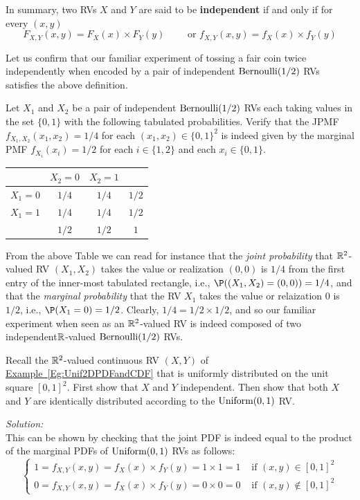 In summary, two RVs $X$ and $Y$ are said to be {\bf independent} if and only if for every $(x,y)$
\[
\boxed{
F_{X,Y}(x,y) = F_X(x) \times F_Y(y) \qquad \text{ or } f_{X,Y}(x,y) = f_X(x) \times f_Y(y)
}
\]

Let us confirm that our familiar experiment of tossing a fair coin twice independently when encoded by a pair of independent $\mbox{{\rm Bernoulli}}(1/2)$ RVs satisfies the above definition.

\begin{example}\label{EgIndepPairOfBernoulis}
Let $X_1$ and $X_2$ be a pair of independent $\mbox{{\rm Bernoulli}}(1/2)$ RVs each taking values in the set $\{0,1\}$ with the following tabulated probabilities. Verify that the JPMF $f_{X_1,X_2}(x_1,x_2)=1/4$ for each $(x_1,x_2) \in \{0,1\}^2$ is indeed given by the marginal PMF $f_{X_i}(x_i)=1/2$ for each $i \in \{1,2\}$ and each $x_i \in \{0,1\}$.

\begin{center}
\begin{tabular}{|c|c c|c|}
\hline
& $X_2=0$ & $X_2=1$ & \\ \hline
$X_1=0$& $1/4$ & $1/4$ & $1/2$ \\
$X_1=1$& $1/4$ & $1/4$ & $1/2$ \\ \hline
& $1/2$ & $1/2$ & $1$\\ \hline
\end{tabular}
\end{center}
From the above Table we can read for instance that the {\em joint probability} that $\mathbb{R}^2$-valued RV $(X_1,X_2)$ takes the value or realization $(0,0)$ is $1/4$ from the first entry of the inner-most tabulated rectangle, 
i.e., $\P((X_1,X_2)=(0,0))=1/4$, 
and that the {\em marginal probability} that the RV $X_1$ takes the value or relaization $0$ is $1/2$, 
i.e., $\P(X_1=0)=1/2$. 
Clearly, $1/4=1/2 \times 1/2$, and so our familiar experiment when seen as an $\mathbb{R}^2$-valued RV is indeed composed of two independent$\mathbb{R}$-valued $\mbox{{\rm Bernoulli}}(1/2)$ RVs. 
\end{example}

\begin{example}\label{EgShowIndepUnifDensityOnUnitSquare}
Recall the $\mathbb{R}^2$-valued continuous RV $(X,Y)$ of \hyperref[Eg:Unif2DPDFandCDF]{Example~\ref*{Eg:Unif2DPDFandCDF}} 
that is uniformly distributed on the unit square $[0,1]^2$. 
First show that $X$ and $Y$ independent. 
Then show that both $X$ and $Y$ are identically distributed according to the $\mbox{{\rm Uniform}}(0,1)$ RV. 

{\em Solution:}\\[4pt]
This can be shown by checking that the joint PDF is indeed equal to the product of the marginal PDFs of $\mbox{{\rm Uniform}}(0,1)$ RVs as follows:
\[
\begin{cases}
1= f_{X,Y}(x,y) =  f_X(x) \times f_Y(y) = 1 \times 1 = 1 & \text{ if } (x,y) \in [0,1]^2\\
0= f_{X,Y}(x,y) =  f_X(x) \times f_Y(y) = 0 \times 0 = 0 & \text{ if } (x,y) \notin [0,1]^2
\end{cases}
\]
\end{example}

